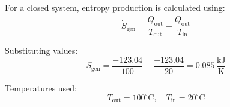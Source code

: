 For a closed system, entropy production is calculated using:  
\[
\dot{S}_{\text{gen}} = \frac{\dot{Q}_{\text{out}}}{T_{\text{out}}} - \frac{\dot{Q}_{\text{out}}}{T_{\text{in}}}
\]  

Substituting values:  
\[
\dot{S}_{\text{gen}} = \frac{-123.04}{100} - \frac{-123.04}{20} = 0.085 \, \frac{\text{kJ}}{\text{K}}
\]  

Temperatures used:  
\[
T_{\text{out}} = 100^\circ\text{C}, \quad T_{\text{in}} = 20^\circ\text{C}
\]